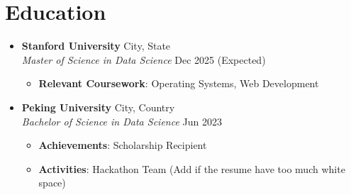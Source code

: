 \section{Education}

\begin{itemize}[leftmargin=0.15in]
    \item[] \textbf{Stanford University} \hfill {City, State} \\
    \textit{\small Master of Science in Data Science} \hfill {\small Dec 2025 (Expected)} \\
    \vspace{-1mm} 
    \begin{itemize}[leftmargin=0.3in, itemsep=0pt]
        \item {\small \textbf{Relevant Coursework}: Operating Systems, Web Development}
    \end{itemize}
    \vspace{-5mm} 

    \item[] \textbf{Peking University} \hfill {City, Country} \\
    \textit{\small Bachelor of Science in Data Science} \hfill {\small Jun 2023} \\
    \vspace{-1mm}
    \begin{itemize}[leftmargin=0.3in, itemsep=0pt]
        \item {\small \textbf{Achievements}: Scholarship Recipient}
        \item {\small \textbf{Activities}: Hackathon Team (Add if the resume have too much white space)}
    \end{itemize}
\end{itemize}


